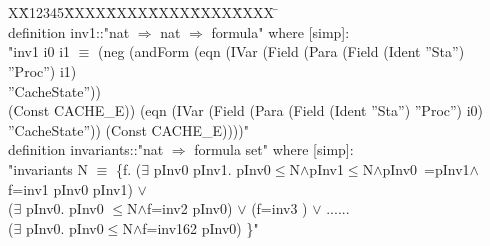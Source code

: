 \documentclass{llncs}
\newlength{\fminilength}
\newenvironment{fmini}[1][\linewidth]
  {\setlength{\fminilength}{#1\fboxsep-2\fboxrule}%
   \vspace{2ex}\noindent\begin{lrbox}{\fminibox}\begin{minipage}{\fminilength}%
   \mbox{ }\hfill\vspace{-2.5ex}}%
  {\end{minipage}\end{lrbox}\vspace{1ex}\hspace{0ex}%
   \framebox{\usebox{\fminibox}}}
\newenvironment{specification}
{\noindent\scriptsize
\tt\begin{fmini}\begin{tabbing}X\=X12345\=XXXX\=XXXX\=XXXX\=XXXX\=XXXX
\=\+\kill} {\end{tabbing}\normalfont\end{fmini}}
\def \pInv {i}
\begin{document}
\begin{specification}\\
definition inv1::"nat $\Rightarrow$ nat $\Rightarrow$ formula" where [simp]:\\
"inv1 \pInv0 \pInv1 $\equiv$
(neg (andForm (eqn (IVar (Field (Para (Field (Ident ''Sta'') ''Proc'') \pInv1)\\ ''CacheState''))\\
 (Const CACHE\_E)) (eqn (IVar (Field (Para (Field (Ident ''Sta'') ''Proc'') \pInv0)\\ ''CacheState'')) (Const CACHE\_E))))"\\
definition invariants::"nat $\Rightarrow$ formula set" where [simp]:\\
"invariants N $\equiv$ \{f.
($\exists$ pInv0 pInv1. pInv0$\le$N$\wedge$pInv1$\le$N$\wedge$pInv0~=pInv1$\wedge$f=inv1  pInv0 pInv1) $\vee$\\
($\exists$ pInv0. pInv0 $\le$N$\wedge$f=inv2  pInv0) $\vee$
(f=inv3  ) $\vee$ ......\\
($\exists$ pInv0. pInv0$\le$N$\wedge$f=inv162  pInv0) \}"\\
\end{specification}\\




\end{document}
